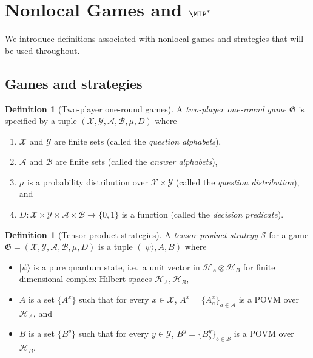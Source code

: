 \documentclass[11pt]{article}
\theoremstyle{definition}
\newtheorem{definition}[theorem]{Definition}
\newcommand{\ket}[1]{|#1\rangle}
\newcommand{\mH}{\ensuremath{\mathcal{H}}}
\newcommand{\game}{\mathfrak{G}}
\newcommand{\strategy}{\mathscr{S}}
\renewcommand{\cal}[1]{\mathcal{#1}}
\begin{document}
 
\section{Nonlocal Games and $\MIP^*$}
\label{sec:games}

We introduce definitions associated with nonlocal games and strategies that will
be used throughout.

\subsection{Games and strategies}
\label{sec:strat}

\begin{definition}[Two-player one-round games]
  \label{def:game}
  A \emph{two-player one-round game} $\game$ is specified by a tuple
  $(\cal{X}, \cal{Y}, \cal{A}, \cal{B}, \mu, D)$ where
  \begin{enumerate}
  \item $\cal{X}$ and $\cal{Y}$ are finite sets (called the \emph{question
      alphabets}),
  \item $\cal{A}$ and $\cal{B}$ are finite sets (called the \emph{answer
      alphabets}),
  \item $\mu$ is a probability distribution over $\cal{X} \times \cal{Y}$
    (called the \emph{question distribution}), and
  \item $D: \cal{X} \times \cal{Y} \times \cal{A} \times \cal{B} \to \{0,1\}$ is
    a function (called the \emph{decision predicate}).
  \end{enumerate}
\end{definition}

\begin{definition}[Tensor product strategies]
  \label{def:tensor-product-strategy}
  A \emph{tensor product strategy} $\strategy$ for a game $\game = (\cal{X},
  \cal{Y}, \cal{A}, \cal{B}, \mu, D)$ is a tuple $(\ket{\psi}, A, B)$ where
  \begin{itemize}
	\item $\ket{\psi}$ is a pure quantum state, i.e.\ a unit vector in $\mH_A \otimes \mH_B$ for finite
    dimensional complex Hilbert spaces $\mH_A, \mH_B$,
	\item $A$ is a set $\{A^x\}$ such that for every $x \in \cal{X}$, $A^x =
    \{A^x_a \}_{a \in \cal{A}}$ is a POVM over $\mH_A$, and
	\item $B$ is a set $\{B^y\}$ such that for every $y \in \cal{Y}$, $B^y =
    \{B^y_b \}_{b \in \cal{B}}$ is a POVM over $\mH_B$.
\end{itemize}
\end{definition}
\end{document}
